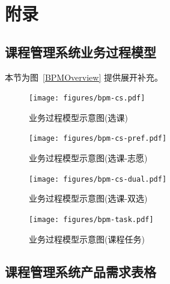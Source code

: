 \chapter*{附\qquad 录}


\appendix

\renewcommand{\thechapter}{A}

\section{课程管理系统业务过程模型}
\label{sec:appendix-bpm}

本节为图~\ref{BPMOverview} 提供展开补充。

\begin{figure}[!hbp]
  \begin{center}
    \texttt{[image: figures/bpm-cs.pdf]}
    \caption{业务过程模型示意图(选课)\label{BPMCourseRegister}}
  \end{center}
\end{figure}

\begin{figure}[!hbp]
  \begin{center}
    \texttt{[image: figures/bpm-cs-pref.pdf]}
    \caption{业务过程模型示意图(选课-志愿)\label{BPMCourseRegisterP}}
  \end{center}
\end{figure}

\begin{figure}[!hbp]
  \begin{center}
    \texttt{[image: figures/bpm-cs-dual.pdf]}
    \caption{业务过程模型示意图(选课-双选)\label{BPMCourseRegisterD}}
  \end{center}
\end{figure}

\begin{figure}[!hbp]
  \begin{center}
    \texttt{[image: figures/bpm-task.pdf]}
    \caption{业务过程模型示意图(课程任务)\label{BPMTask}}
  \end{center}
\end{figure}

\newpage

\section{课程管理系统产品需求表格}
\label{sec:appendix-requirement-table}


